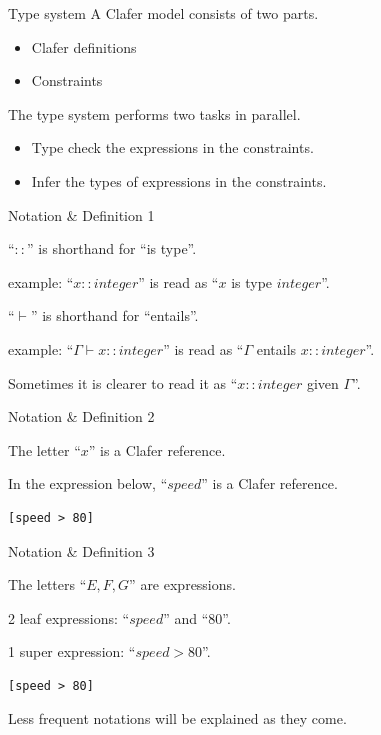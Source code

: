 \documentclass[table,15pt,t]{beamer}
\begin{document}
\begin{frame}[fragile,c]{Type system}
A Clafer model consists of two parts.
\begin{itemize}
\item Clafer definitions
\item Constraints
\end{itemize}

\vfill The type system performs two tasks in parallel.
\begin{itemize}
\item Type check the expressions in the constraints.
\item Infer the types of expressions in the constraints.
\end{itemize}
\end{frame}

\begin{frame}[fragile,c]{Notation \& Definition 1}
\begin{definition}
``$::$'' is shorthand for ``is type''.
\end{definition}
example: ``$x::integer$'' is read as ``$x$ is type $integer$''.

\begin{definition}
``$\vdash$'' is shorthand for ``entails''.
\end{definition}

example: ``$\Gamma\vdash x::integer$'' is read as ``$\Gamma$ entails $x::integer$''.

Sometimes it is clearer to read it as ``$x::integer$ given $\Gamma$''.
\end{frame}


\begin{frame}[fragile,c]{Notation \& Definition 2}
\begin{definition}
The letter ``$x$'' is a Clafer reference.
\end{definition}

In the expression below, ``$speed$'' is a Clafer reference.
\begin{lstlisting}
[speed > 80]
\end{lstlisting}
\end{frame}

\begin{frame}[fragile,c]{Notation \& Definition 3}

\begin{definition}
The letters ``$E,F,G$'' are expressions.
\end{definition}

2 leaf expressions: ``$speed$'' and ``$80$''.

1 super expression: ``$speed > 80$''.
\begin{lstlisting}
[speed > 80]
\end{lstlisting}

\vfill Less frequent notations will be explained as they come.
\end{frame}
\end{document}
